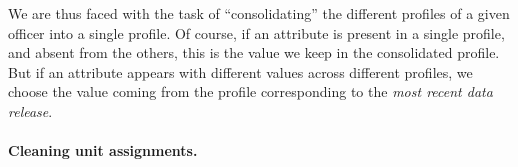 We are thus faced with the task of “consolidating” the different profiles of
a given officer into a single profile. Of course, if an attribute is present in
a single profile, and absent from the others, this is the value we keep in the
consolidated profile. But if an attribute appears with different values across
different profiles, we choose the value coming from the profile corresponding
to the \emph{most recent data release}.

\paragraph{Cleaning unit assignments.}
